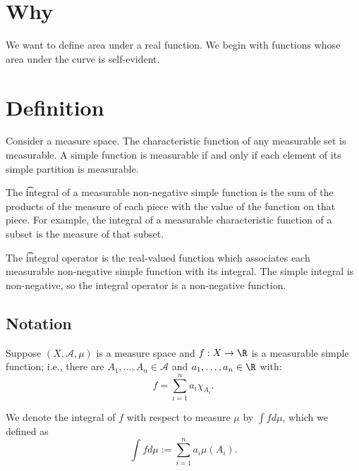 
\section*{Why}

We want to define area under a real function.
We begin with functions whose area under the curve is self-evident.

\section*{Definition}

Consider a measure space.
The characteristic function of any measurable set is measurable.
A simple function is measurable if and only if each element of its simple partition is measurable.

The \t{integral} of a measurable non-negative simple function is the sum of the products of the measure of each piece with the value of the function on that piece.
For example, the integral of a measurable characteristic function of a subset is the measure of that subset.

The \t{integral operator} is the real-valued function which associates each measurable non-negative simple function with its integral.
The simple integral is non-negative, so the integral operator is a non-negative function.

\subsection*{Notation}


Suppose $(X, \mathcal{A} , \mu )$ is a measure space and $f: X \to \R $ is a measurable simple function; i.e., there are $A_1, \dots , A_n \in \mathcal{A} $ and $a_1, \dots , a_n \in \R $ with:
\[
f = \sum_{i = 1}^{n} a_i \chi _{A_i}.
\]

We denote the integral of $f$ with respect to measure $\mu $ by $\int  f d\mu $, which we defined as
\[
\int  f d\mu  := \sum_{i = 1}^{n} a_i \mu (A_i).
\]

